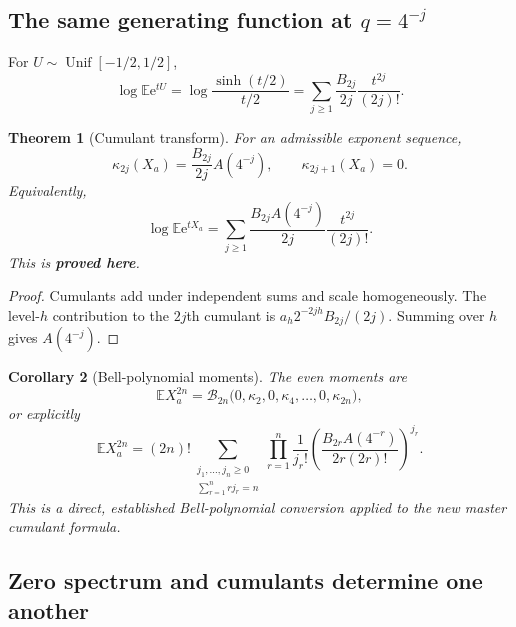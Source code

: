 \documentclass[11pt,oneside]{article}
\numberwithin{equation}{section}
\newtheorem{theorem}{Theorem}[section]
\newtheorem{corollary}[theorem]{Corollary}
\theoremstyle{definition}
\theoremstyle{remark}
\newcommand{\E}{\mathbb E}
\newcommand{\e}{\mathrm e}
\newcommand{\statusproved}{\textcolor{deepgreen}{\textbf{proved here}}}
\newcommand{\Bell}{\mathcal B}
\begin{document}
\subsection{The same generating function at $q=4^{-j}$}

For $U\sim\operatorname{Unif}[-1/2,1/2]$,
\begin{equation}
 \log\E\e^{tU}
 =\log\frac{\sinh(t/2)}{t/2}
 =\sum_{j\ge1}\frac{B_{2j}}{2j}\frac{t^{2j}}{(2j)!}.
 \label{eq:uniform-cumulants}
\end{equation}

\begin{theorem}[Cumulant transform]
\label{thm:cumulants}
For an admissible exponent sequence,
\begin{equation}
 \boxed{\quad
 \kappa_{2j}(X_a)=\frac{B_{2j}}{2j}A(4^{-j}),
 \qquad
 \kappa_{2j+1}(X_a)=0.
 \quad}
 \label{eq:kappa-a}
\end{equation}
Equivalently,
\begin{equation}
 \log\E\e^{tX_a}
 =\sum_{j\ge1}\frac{B_{2j}A(4^{-j})}{2j}\frac{t^{2j}}{(2j)!}.
 \label{eq:mgf-a}
\end{equation}
This is \statusproved.
\end{theorem}

\begin{proof}
Cumulants add under independent sums and scale homogeneously.  The level-$h$ contribution to
the $2j$th cumulant is $a_h2^{-2jh}B_{2j}/(2j)$.  Summing over $h$ gives
$A(4^{-j})$.
\end{proof}

\begin{corollary}[Bell-polynomial moments]
\label{cor:bell-moments}
The even moments are
\begin{equation}
 \E X_a^{2n}
 =\Bell_{2n}\bigl(0,\kappa_2,0,\kappa_4,\ldots,0,\kappa_{2n}\bigr),
 \label{eq:bell-moments}
\end{equation}
or explicitly
\begin{equation}
 \E X_a^{2n}
 =(2n)!\!\sum_{\substack{j_1,\ldots,j_n\ge0\\
                         \sum_{r=1}^nrj_r=n}}
 \prod_{r=1}^{n}\frac1{j_r!}
 \left(
   \frac{B_{2r}A(4^{-r})}{2r(2r)!}
 \right)^{j_r}.
 \label{eq:partition-moments}
\end{equation}
This is a direct, established Bell-polynomial conversion applied to the new master cumulant
formula.
\end{corollary}

\subsection{Zero spectrum and cumulants determine one another}
\end{document}
